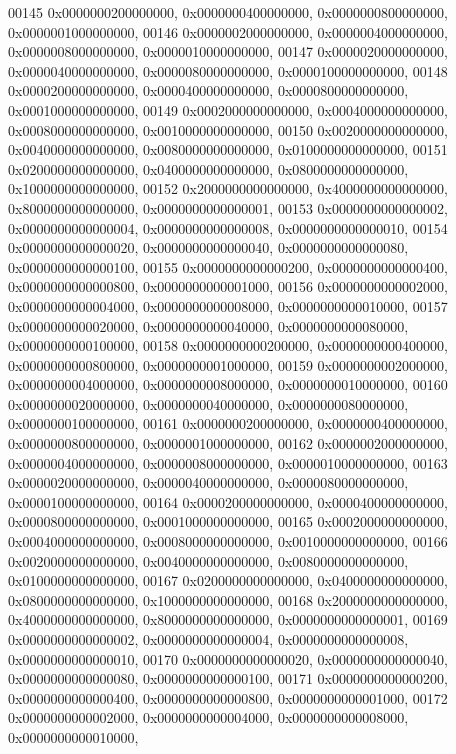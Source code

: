 \begin{DoxyCode}
00145         0x0000000200000000, 0x0000000400000000, 0x0000000800000000, 0x0000001000000000,
00146         0x0000002000000000, 0x0000004000000000, 0x0000008000000000, 0x0000010000000000,
00147         0x0000020000000000, 0x0000040000000000, 0x0000080000000000, 0x0000100000000000,
00148         0x0000200000000000, 0x0000400000000000, 0x0000800000000000, 0x0001000000000000,
00149         0x0002000000000000, 0x0004000000000000, 0x0008000000000000, 0x0010000000000000,
00150         0x0020000000000000, 0x0040000000000000, 0x0080000000000000, 0x0100000000000000,
00151         0x0200000000000000, 0x0400000000000000, 0x0800000000000000, 0x1000000000000000,
00152         0x2000000000000000, 0x4000000000000000, 0x8000000000000000, 0x0000000000000001,
00153         0x0000000000000002, 0x0000000000000004, 0x0000000000000008, 0x0000000000000010,
00154         0x0000000000000020, 0x0000000000000040, 0x0000000000000080, 0x0000000000000100,
00155         0x0000000000000200, 0x0000000000000400, 0x0000000000000800, 0x0000000000001000,
00156         0x0000000000002000, 0x0000000000004000, 0x0000000000008000, 0x0000000000010000,
00157         0x0000000000020000, 0x0000000000040000, 0x0000000000080000, 0x0000000000100000,
00158         0x0000000000200000, 0x0000000000400000, 0x0000000000800000, 0x0000000001000000,
00159         0x0000000002000000, 0x0000000004000000, 0x0000000008000000, 0x0000000010000000,
00160         0x0000000020000000, 0x0000000040000000, 0x0000000080000000, 0x0000000100000000,
00161         0x0000000200000000, 0x0000000400000000, 0x0000000800000000, 0x0000001000000000,
00162         0x0000002000000000, 0x0000004000000000, 0x0000008000000000, 0x0000010000000000,
00163         0x0000020000000000, 0x0000040000000000, 0x0000080000000000, 0x0000100000000000,
00164         0x0000200000000000, 0x0000400000000000, 0x0000800000000000, 0x0001000000000000,
00165         0x0002000000000000, 0x0004000000000000, 0x0008000000000000, 0x0010000000000000,
00166         0x0020000000000000, 0x0040000000000000, 0x0080000000000000, 0x0100000000000000,
00167         0x0200000000000000, 0x0400000000000000, 0x0800000000000000, 0x1000000000000000,
00168         0x2000000000000000, 0x4000000000000000, 0x8000000000000000, 0x0000000000000001,
00169         0x0000000000000002, 0x0000000000000004, 0x0000000000000008, 0x0000000000000010,
00170         0x0000000000000020, 0x0000000000000040, 0x0000000000000080, 0x0000000000000100,
00171         0x0000000000000200, 0x0000000000000400, 0x0000000000000800, 0x0000000000001000,
00172         0x0000000000002000, 0x0000000000004000, 0x0000000000008000, 0x0000000000010000,

\end{DoxyCode}
